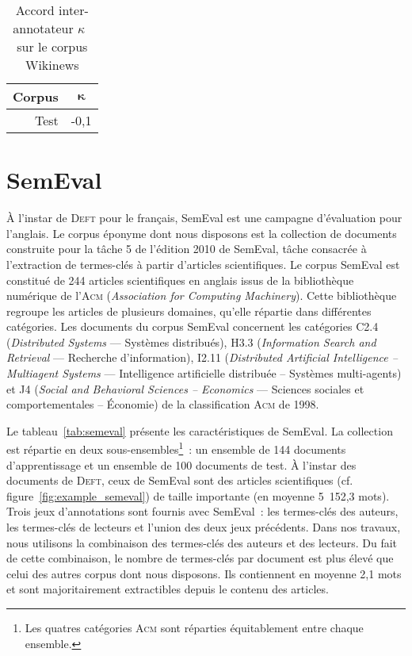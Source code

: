     \begin{table}[!h]
      \centering
      \begin{tabular}{r|c}
        \toprule
        \textbf{Corpus} & $\boldsymbol{\kappa}$\\
        \hline
        Test & -0,1\\
        \bottomrule
      \end{tabular}

      \caption{Accord inter-annotateur $\kappa$~\cite{fleiss1971kappa} sur le
               corpus Wikinews
               \label{tab:wikinews_kappa}}
    \end{table}


  \section[SemEval]{SemEval~\textnormal{\large\cite{kim2010semeval}}}
  \label{sec:main-data_description-semeval_data}
    À l'instar de \textsc{Deft} pour le français, SemEval est une campagne
    d'évaluation pour l'anglais. Le corpus éponyme dont nous disposons est la
    collection de documents construite pour la tâche 5 de l'édition 2010 de
    SemEval, tâche consacrée à l'extraction de termes-clés à partir d'articles
    scientifiques. Le corpus SemEval est constitué de 244 articles scientifiques
    en anglais issus de la bibliothèque numérique de l'\textsc{Acm}
    (\textit{Association for Computing Machinery}). Cette bibliothèque regroupe
    les articles de plusieurs domaines, qu'elle répartie dans différentes
    catégories. Les documents du corpus SemEval concernent les catégories C2.4
    (\textit{Distributed Systems} --- Systèmes distribués), H3.3
    (\textit{Information Search and Retrieval} --- Recherche d'information),
    I2.11 (\textit{Distributed Artificial Intelligence -- Multiagent Systems}
    --- Intelligence artificielle distribuée -- Systèmes multi-agents) et J4
    (\textit{Social and Behavioral Sciences -- Economics} --- Sciences sociales
    et comportementales -- Économie) de la classification \textsc{Acm} de 1998.
    
    Le tableau~\ref{tab:semeval} présente les caractéristiques de SemEval. La
    collection est répartie en deux sous-ensembles\footnote{Les quatres
    catégories \textsc{Acm} sont réparties équitablement entre chaque
    ensemble.}~: un ensemble de 144 documents d'apprentissage et un ensemble de
    100 documents de test. À l'instar des documents de \textsc{Deft}, ceux de
    SemEval sont des articles scientifiques (cf.
    figure~\ref{fig:example_semeval}) de taille importante (en moyenne 5~152,3
    mots). Trois jeux d'annotations sont fournis avec SemEval~: les termes-clés
    des auteurs, les termes-clés de lecteurs et l'union des deux jeux
    précédents. Dans nos travaux, nous utilisons la combinaison des termes-clés
    des auteurs et des lecteurs. Du fait de cette combinaison, le nombre de
    termes-clés par document est plus élevé que celui des autres corpus dont
    nous disposons. Ils contiennent en moyenne 2,1 mots et sont majoritairement
    extractibles depuis le contenu des articles.

